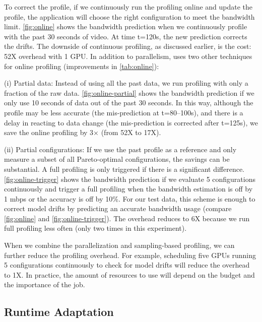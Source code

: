 To correct the profile, if we continuously run the profiling online and update
the profile, the application will choose the right configuration to meet the
bandwidth limit.  \autoref{fig:online} shows the bandwidth prediction when we
continuously profile with the past 30 seconds of video. At time t=120s, the new
prediction corrects the drifts. The downside of continuous profiling, as
discussed earlier, is the cost: 52X overhead with 1 GPU\@. In addition to
parallelism, \sysname{} uses two other techniques for online profiling
(improvements in \autoref{tab:online}):

(i) Partial data: Instead of using all the past data, we run profiling with only
a fraction of the raw data.  \autoref{fig:online-partial} shows the bandwidth
prediction if we only use 10 seconds of data out of the past 30 seconds. In this
way, although the profile may be less accurate (the mis-prediction at
t=80--100s), and there is a delay in reacting to data change (the mis-prediction
is corrected after t=125s), we save the online profiling by 3$\times$ (from 52X
to 17X).

(ii) Partial configurations: If we use the past profile as a reference and only
measure a subset of all Pareto-optimal configurations, the savings can be
substantial. A full profiling is only triggered if there is a significant
difference. \autoref{fig:online-trigger} shows the bandwidth prediction if we
evaluate 5 configurations continuously and trigger a full profiling when the
bandwidth estimation is off by 1 mbps or the accuracy is off by 10\%.  For our
test data, this scheme is enough to correct model drifts by predicting an
accurate bandwidth usage (compare \autoref{fig:online} and
\autoref{fig:online-trigger}).  The overhead reduces to 6X because we run full
profiling less often (only two times in this experiment).

When we combine the parallelization and sampling-based profiling, we can further
reduce the profiling overhead. For example, scheduling five GPUs running 5
configurations continuously to check for model drifts will reduce the overhead
to 1X\@. In practice, the amount of resources to use will depend on the budget
and the importance of the job.



\subsection{Runtime Adaptation}
\label{sec:runtime-adaptation}

